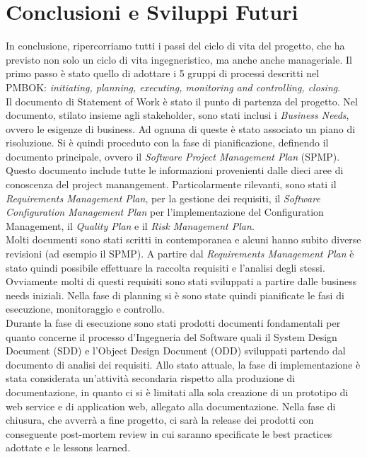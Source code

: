 \documentclass[conference]{IEEEtran}
\begin{document}
\section{Conclusioni e Sviluppi Futuri}
In conclusione, ripercorriamo tutti i passi del ciclo di vita del progetto, che ha previsto non solo un ciclo di vita ingegneristico, ma anche anche manageriale. Il primo passo \`{e} stato quello di adottare i 5 gruppi di processi descritti nel PMBOK: \emph{initiating, planning, executing, monitoring and controlling, closing}.\\
Il documento di Statement of Work \`{e} stato il punto di partenza del progetto. Nel documento, stilato insieme agli stakeholder, sono stati inclusi i \emph{Business Needs}, ovvero le esigenze di business. Ad ognuna di queste \`{e} stato associato un piano di risoluzione.
Si \`{e} quindi proceduto con la fase di pianificazione, definendo il documento principale, ovvero il \emph{Software Project Management Plan} (SPMP). Questo documento include tutte le informazioni provenienti dalle dieci aree di conoscenza del project manangement. Particolarmente rilevanti, sono stati il \emph{Requirements Management Plan}, per la gestione dei requisiti, il \emph{Software Configuration Management Plan} per l\rq implementazione del Configuration Management, il \emph{Quality Plan} e il \emph{Risk Management Plan}.\\
Molti documenti sono stati scritti in contemporanea e alcuni hanno subito diverse revisioni (ad esempio il SPMP).
A partire dal \emph{Requirements Management Plan} \`{e} stato quindi possibile effettuare la raccolta requisiti e l\rq analisi degli stessi. Ovviamente molti di questi requisiti sono stati sviluppati a partire dalle business needs iniziali. 
Nella fase di planning si \`{e} sono state quindi pianificate le fasi di esecuzione, monitoraggio e controllo.\\
Durante la fase di esecuzione sono stati prodotti documenti fondamentali per quanto concerne il processo d\rq Ingegneria del Software quali il System Design Document (SDD) e l\rq Object Design Document (ODD) sviluppati partendo dal documento di analisi dei requisiti.
Allo stato attuale, la fase di implementazione \`{e} stata considerata un\rq attivit\`{a} secondaria rispetto alla produzione di documentazione, in quanto ci si \`{e} limitati alla sola creazione di un prototipo di web service e di application web, allegato alla documentazione.
Nella fase di chiusura, che avverr\`{a} a fine progetto, ci sar\`{a} la release dei prodotti con conseguente post-mortem review in cui saranno specificate le best practices adottate e le lessons learned.\\
\end{document}
